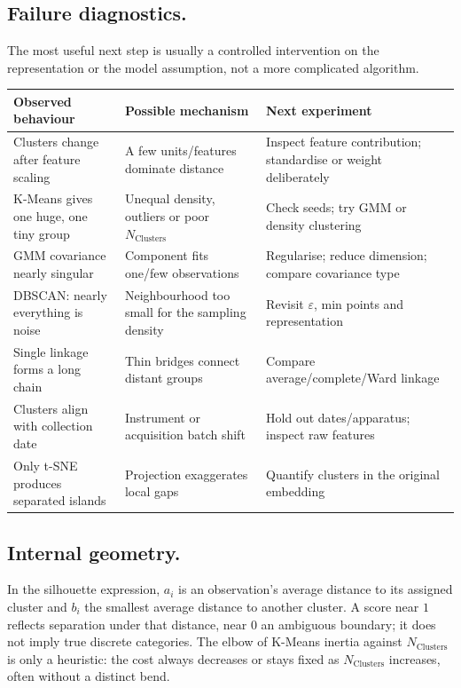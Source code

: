 \subsection{Failure diagnostics.}
The most useful next step is usually a controlled intervention on the representation or the model assumption, not a more complicated algorithm.
\begin{center}
\begingroup\ULtight\small
\begin{tabular}{@{}p{.32\linewidth}p{.32\linewidth}p{.29\linewidth}@{}}
\hline
\textbf{Observed behaviour} & \textbf{Possible mechanism} & \textbf{Next experiment}\\\hline
Clusters change after feature scaling & A few units/features dominate distance & Inspect feature contribution; standardise or weight deliberately\\
K-Means gives one huge, one tiny group & Unequal density, outliers or poor $N_{\text{Clusters}}$ & Check seeds; try GMM or density clustering\\
GMM covariance nearly singular & Component fits one/few observations & Regularise; reduce dimension; compare covariance type\\
DBSCAN: nearly everything is noise & Neighbourhood too small for the sampling density & Revisit $\varepsilon$, min points and representation\\
Single linkage forms a long chain & Thin bridges connect distant groups & Compare average/complete/Ward linkage\\
Clusters align with collection date & Instrument or acquisition batch shift & Hold out dates/apparatus; inspect raw features\\
Only t-SNE produces separated islands & Projection exaggerates local gaps & Quantify clusters in the original embedding\\
\hline
\end{tabular}
\label{tab:failures}
\endgroup
\end{center}

\subsection{Internal geometry.}
In the silhouette expression, $a_i$ is an observation's average distance to its assigned cluster and $b_i$ the smallest average distance to another cluster.
A score near $1$ reflects separation under that distance, near $0$ an ambiguous boundary; it does not imply true discrete categories.
The elbow of K-Means inertia against $N_{\text{Clusters}}$ is only a heuristic: the cost always decreases or stays fixed as $N_{\text{Clusters}}$ increases, often without a distinct bend.
